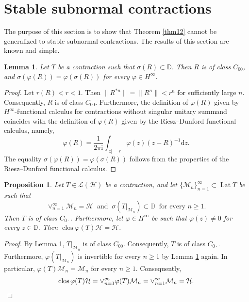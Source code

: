\documentclass[a4paper,oneside,11pt]{amsart}
\numberwithin{equation}{section}
\theoremstyle{plain}
\newtheorem{lemma}[theorem]{Lemma}
\newtheorem{proposition}[theorem]{Proposition}
\theoremstyle{definition}
\begin{document}
\section{Stable subnormal contractions}

The purpose of this section is to show that Theorem \ref{thm12} cannot be generalized to stable subnormal contractions. 
The results of this section
 are known and simple. 

\begin{lemma}\label{lem41} Let $T$ be a contraction such that  $\sigma(R)\subset\mathbb D$. Then $R$ is of class $C_{00}$, 
and $\sigma(\varphi(R))=\varphi(\sigma(R))$ for every $\varphi\in H^\infty$.
\end{lemma}

 \begin{proof} Let $r(R)<r<1$. Then $\|R^{*n}\|=\|R^n\|<r^n$ for sufficiently large $n$. Consequently, $R$ is of class $C_{00}$. 
Furthermore, the definition of $\varphi(R)$ given by $H^\infty$-functional calculus for  contractions without singular unitary summand coincides with 
the definition of $\varphi(R)$ given by the  Riesz--Dunford functional calculus, namely, 
\begin{equation*} \varphi(R)=\frac{1}{2\pi\mathrm{i}}\int_{|z|=r}\varphi(z)(z-R)^{-1}\mathrm{d}z.
\end{equation*}
The equality $\sigma(\varphi(R))=\varphi(\sigma(R))$ follows from the properties of the  Riesz--Dunford functional calculus. 
\end{proof}


\begin{proposition} \label{prop42} Let $T\in\mathcal L(\mathcal H)$ be a contraction, and let 
$\{\mathcal  M_n\}_{n=1}^\infty\subset\operatorname{Lat}T$ be such that 
\begin{equation*}\vee_{n=1}^\infty\mathcal  M_n=\mathcal H \ \text{ and } \ \sigma(T|_{\mathcal  M_n})\subset\mathbb D \ \text{ for every }n\geq 1.
\end{equation*}
Then $T$ is of class $C_{0\cdot}$. Furthermore, let $\varphi\in H^\infty$ be such that $\varphi(z)\neq 0$ for every $z\in\mathbb D$. 
Then $\operatorname{clos}\varphi(T)\mathcal H=\mathcal H$.
\end{proposition}

\begin{proof} By Lemma \ref{lem41}, $T|_{\mathcal  M_n}$ is of class $C_{00}$. 
 Consequently,  $T$ is of class $C_{0\cdot}$. Furthermore,     $\varphi(T|_{\mathcal  M_n})$ is invertible 
for every $n\geq 1$ by Lemma \ref{lem41} again. In particular, 
$\varphi(T)\mathcal  M_n =\mathcal  M_n$ for  every $n\geq 1$. Consequently, 
\begin{equation*}\operatorname{clos}\varphi(T)\mathcal H= \vee_{n=1}^\infty\varphi(T)\mathcal  M_n=
\vee_{n=1}^\infty\mathcal  M_n=\mathcal H. \qedhere
\end{equation*}
\end{proof}
\end{document}
